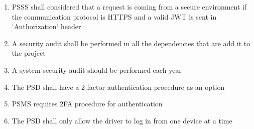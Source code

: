 \begin{enumerate}[resume, label=SEC-\arabic*]
    \item PSSS shall considered that a request is coming from a secure environment if the communication protocol is HTTPS and a valid JWT is sent in `Authorization` header
    \item A security audit shall be performed in all the dependencies that are add it to the project
    \item A system security audit should be performed each year
    \item The PSD shall have a 2 factor authentication procedure as an option
    \item PSMS requires 2FA procedure for authentication
    \item The PSD shall only allow the driver to log in from one device at a time
\end{enumerate}